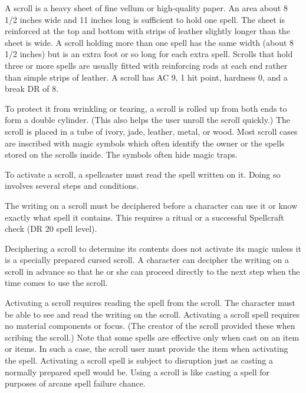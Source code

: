              A scroll is a heavy sheet of fine vellum or high-quality paper.
            An area about 8 1/2 inches wide and 11 inches long is sufficient to hold one spell.
            The sheet is reinforced at the top and bottom with strips of leather slightly longer than the sheet is wide.
            A scroll holding more than one spell has the same width (about 8 1/2 inches) but is an extra foot or so long for each extra spell.
            Scrolls that hold three or more spells are usually fitted with reinforcing rods at each end rather than simple strips of leather.
            A scroll has AC 9, 1 hit point, hardness 0, and a break DR of 8.

            To protect it from wrinkling or tearing, a scroll is rolled up from both ends to form a double cylinder.
            (This also helps the user unroll the scroll quickly.) The scroll is placed in a tube of ivory, jade, leather, metal, or wood.
            Most scroll cases are inscribed with magic symbols which often identify the owner or the spells stored on the scrolls inside.
            The symbols often hide magic traps.

             To activate a scroll, a spellcaster must read the spell written on it.
            Doing so involves several steps and conditions.

             The writing on a scroll must be deciphered before a character can use it or know exactly what spell it contains.
            This requires a  ritual or a successful Spellcraft check (DR 20 \add spell level).

            Deciphering a scroll to determine its contents does not activate its magic unless it is a specially prepared cursed scroll.
            A character can decipher the writing on a scroll in advance so that he or she can proceed directly to the next step when the time comes to use the scroll.

             Activating a scroll requires reading the spell from the scroll.
            The character must be able to see and read the writing on the scroll.
            Activating a scroll spell requires no material components or focus.
            (The creator of the scroll provided these when scribing the scroll.) Note that some spells are effective only when cast on an item or items.
            In such a case, the scroll user must provide the item when activating the spell.
            Activating a scroll spell is subject to disruption just as casting a normally prepared spell would be.
            Using a scroll is like casting a spell for purposes of arcane spell failure chance.

